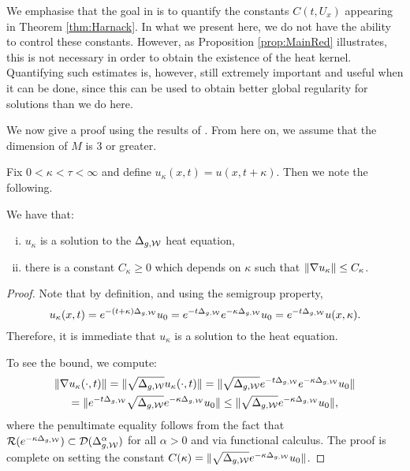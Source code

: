 \documentclass[a4paper, 12pt]{amsart}
\begin{document}
We emphasise that the goal in \cite{SC}
is to quantify the constants $C(t,U_x)$
appearing in Theorem \ref{thm:Harnack}. In what we present here, we do not have
the ability to control these constants. However, as
Proposition \ref{prop:MainRed} illustrates, this is not necessary 
in order to obtain the existence of the heat kernel.
Quantifying such estimates is, however, still 
extremely important and useful when it can be done, 
since this can be used to obtain better global regularity for
solutions than we do here.

We now give a proof using the results of \cite{CS}.
From here on, we assume that the dimension of $M$ is $3$ or greater. 

Fix $0 < \kappa < \tau < \infty$ and 
define $u_\kappa(x,t) = u(x,t+\kappa)$. Then we note the following. 
\begin{lemma}
\label{lem:shiftsol}
We have that: 
\begin{enumerate}[(i)] 
\item $u_\kappa$ is a solution to the $\Delta_{g,\mathcal{W}}$ heat equation, 
\item there is a constant $C_\kappa \geq 0$
	which depends on $\kappa$ 
	such that $\| \nabla u_\kappa \| \leq C_\kappa$.
\end{enumerate} 
\end{lemma}
\begin{proof}
Note that by definition, and using the semigroup property, 
$$u_\kappa(x,t) = e^{-(t + \kappa)\Delta_{g,\mathcal{W}}} u_0 
	=e^{-t \Delta_{g,\mathcal{W}}}e^{-\kappa\Delta_{g,\mathcal{W}}}u_0
	=e^{-t \Delta_{g,\mathcal{W}}}u(x,\kappa).$$ 
Therefore, it is immediate that $u_\kappa$ is a solution
to the heat equation. 

To see the bound, we compute: 
\begin{multline*} 
\|  \nabla u_\kappa(\cdot, t) \| 
	= \|  \sqrt{\Delta_{g,\mathcal{W}}} u_\kappa(\cdot, t) \| 
	= \|  \sqrt{\Delta_{g,\mathcal{W}}} e^{-t\Delta_{g,\mathcal{W}}} e^{-\kappa \Delta_{g,\mathcal{W}}}u_0 \| \\
	= \|  e^{-t \Delta_{g,\mathcal{W}}} \sqrt{ \Delta_{g,\mathcal{W}}} e^{-\kappa \Delta_{g,\mathcal{W}}}u_0 \|
	\leq \| \sqrt{ \Delta_{g,\mathcal{W}}} e^{-\kappa \Delta_{g,\mathcal{W}}}u_0 \|,
\end{multline*}
where the penultimate equality follows from the fact that
${\mathcal{R}}(e^{-\kappa \Delta_{g,\mathcal{W}}}) \subset {\mathcal{D}}(\Delta_{g,\mathcal{W}}^\alpha)$
for all $\alpha > 0$ and via functional calculus.
The proof is complete on setting the constant 
$C(\kappa) = \| \sqrt{ \Delta_{g,\mathcal{W}}} e^{-\kappa \Delta_{g,\mathcal{W}}}u_0 \|$.
\end{proof}
\end{document}
